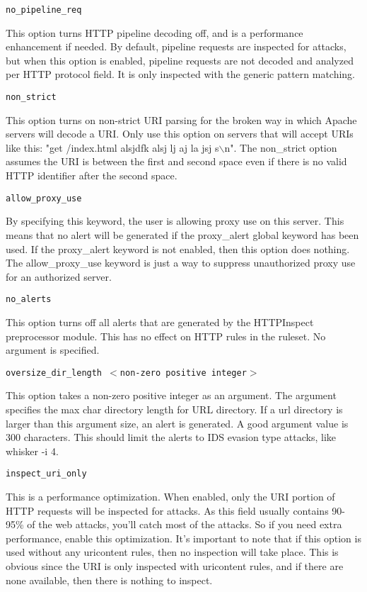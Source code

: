 \documentclass[english]{report}
\newcounter{slistnum}
\newenvironment{slist}
{ \begin{list}{ {\bf \arabic{slistnum}.} }{\usecounter{slistnum} } }
{ \end{list} }
\begin{document}
\begin{slist}
\item \texttt{no\_pipeline\_req}

This option turns HTTP pipeline decoding off, and is a performance enhancement
if needed.  By default, pipeline requests are inspected for attacks, but when
this option is enabled, pipeline requests are not decoded and analyzed per
HTTP protocol field.  It is only inspected with the generic pattern
matching.

\item \texttt{non\_strict}

This option turns on non-strict URI parsing for the broken way in which Apache
servers will decode a URI.  Only use this option on servers that will accept
URIs like this: "get /index.html alsjdfk alsj lj aj  la jsj s$\backslash$n".  The
non\_strict option assumes the URI is between the first and second space even if
there is no valid HTTP identifier after the second space.

\item \texttt{allow\_proxy\_use}

By specifying this keyword, the user is allowing proxy use on this server.
This means that no alert will be generated if the proxy\_alert global keyword
has been used.  If the proxy\_alert keyword is not enabled, then this option
does nothing.  The allow\_proxy\_use keyword is just a way to suppress
unauthorized proxy use for an authorized server.  

\item \texttt{no\_alerts}

This option turns off all alerts that are generated by the HTTPInspect
preprocessor module.  This has no effect on HTTP rules in the ruleset.  No
argument is specified.

\item \texttt{oversize\_dir\_length $<$non-zero positive integer$>$}

This option takes a non-zero positive integer as an argument.  The argument
specifies the max char directory length for URL directory.  If a url directory
is larger than this argument size, an alert is generated. A good argument
value is 300 characters.  This should limit the alerts to IDS evasion type attacks,
like whisker -i 4.

\item \texttt{inspect\_uri\_only}

This is a performance optimization.  When enabled, only the URI portion of HTTP
requests will be inspected for attacks.  As this field usually contains 90-95\%
of the web attacks, you'll catch most of the attacks.  So if you need extra
performance, enable this optimization.  It's important to note that if
this option is used without any uricontent rules, then no inspection will take
place.  This is obvious since the URI is only inspected with uricontent rules,
and if there are none available, then there is nothing to inspect.


\end{slist}
\end{document}
